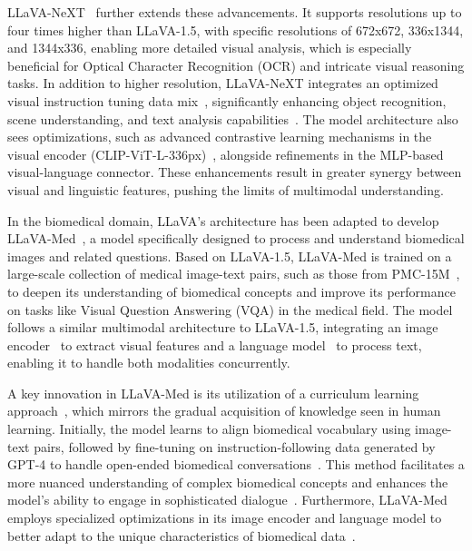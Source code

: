 \documentclass[10pt,letterpaper]{article}
\begin{document}
LLaVA-NeXT~\cite{liu2024llavanext} further extends these advancements. It supports resolutions up to four times higher than LLaVA-1.5, with specific resolutions of 672x672, 336x1344, and 1344x336, enabling more detailed visual analysis, which is especially beneficial for Optical Character Recognition (OCR) and intricate visual reasoning tasks. In addition to higher resolution, LLaVA-NeXT integrates an optimized visual instruction tuning data mix~\cite{chen2023politeflamingo}, significantly enhancing object recognition, scene understanding, and text analysis capabilities~\cite{zhang2023llavar}. The model architecture also sees optimizations, such as advanced contrastive learning mechanisms in the visual encoder (CLIP-ViT-L-336px)~\cite{liu2023improvedllava}, alongside refinements in the MLP-based visual-language connector. These enhancements result in greater synergy between visual and linguistic features, pushing the limits of multimodal understanding.

In the biomedical domain, LLaVA's architecture has been adapted to develop LLaVA-Med~\cite{li2023llavamed}, a model specifically designed to process and understand biomedical images and related questions. Based on LLaVA-1.5, LLaVA-Med is trained on a large-scale collection of medical image-text pairs, such as those from PMC-15M~\cite{lin2023pmc}, to deepen its understanding of biomedical concepts and improve its performance on tasks like Visual Question Answering (VQA) in the medical field. The model follows a similar multimodal architecture to LLaVA-1.5, integrating an image encoder~\cite{zhang2023large} to extract visual features and a language model~\cite{vicuna2023} to process text, enabling it to handle both modalities concurrently.

A key innovation in LLaVA-Med is its utilization of a curriculum learning approach~\cite{liu2023llava}, which mirrors the gradual acquisition of knowledge seen in human learning. Initially, the model learns to align biomedical vocabulary using image-text pairs, followed by fine-tuning on instruction-following data generated by GPT-4 to handle open-ended biomedical conversations~\cite{peng2023instruction}. This method facilitates a more nuanced understanding of complex biomedical concepts and enhances the model's ability to engage in sophisticated dialogue~\cite{venigalla2022biomedlm}. Furthermore, LLaVA-Med employs specialized optimizations in its image encoder and language model to better adapt to the unique characteristics of biomedical data~\cite{vanSonsbeek2023open, alayrac2022flamingo}.
\end{document}
